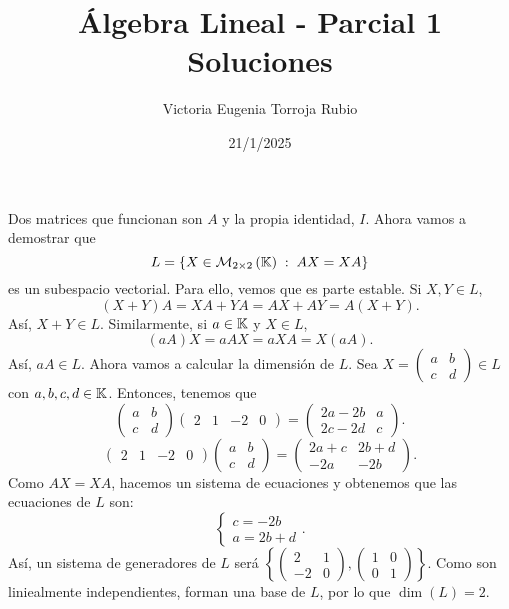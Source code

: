 \documentclass{article}
\begin{document}
\title{Álgebra Lineal - Parcial 1 Soluciones}
\author{Victoria Eugenia Torroja Rubio}
\date{21/1/2025}

\maketitle

\begin{sol}
Dos matrices que funcionan son $\displaystyle A $ y la propia identidad, $\displaystyle I $. Ahora vamos a demostrar que 
\[L = \left\{ X \in \mathcal{M}_{2\times2}\left(\mathbb{K}\right) \; : \; AX = XA\right\} \]
es un subespacio vectorial. Para ello, vemos que es parte estable. Si $\displaystyle X,Y \in L $,
\[ \left(X + Y\right) A = XA + YA = AX + AY = A \left(X + Y\right) .\]
Así, $\displaystyle X + Y \in L $. Similarmente, si $\displaystyle a \in \mathbb{K} $ y $\displaystyle X \in L $,
\[ \left(aA\right)X = a A X = a X A = X \left(aA\right) .\]
Así, $\displaystyle aA \in L $. Ahora vamos a calcular la dimensión de $\displaystyle L $. Sea $\displaystyle X = \begin{pmatrix} a & b \\ c & d \end{pmatrix} \in L $ con $\displaystyle a,b,c,d \in \mathbb{K} $. Entonces, tenemos que
\[\begin{pmatrix} a & b \\ c & d \end{pmatrix} \begin{pmatrix} 2 & 1 & -2 & 0 \end{pmatrix} = \begin{pmatrix} 2a-2b & a \\ 2c - 2d & c \end{pmatrix} .\]
\[  \begin{pmatrix} 2 & 1 & -2 & 0 \end{pmatrix}\begin{pmatrix} a & b \\ c & d \end{pmatrix} = \begin{pmatrix} 2a + c & 2b + d \\ -2a & - 2b \end{pmatrix}.\]
Como $\displaystyle AX = XA $, hacemos un sistema de ecuaciones y obtenemos que las ecuaciones de $\displaystyle L $ son:
\[
\begin{cases}
c = -2b \\
a = 2b + d
\end{cases}
.\]
Así, un sistema de generadores de $\displaystyle L $ será $\displaystyle \left\{ \begin{pmatrix} 2 & 1 \\ - 2 & 0 \end{pmatrix}, \begin{pmatrix} 1 & 0 \\ 0 & 1 \end{pmatrix}\right\}  $. Como son liniealmente independientes, forman una base de $\displaystyle L $, por lo que $\displaystyle \dim\left(L\right) = 2 $.
\end{sol}
\end{document}
